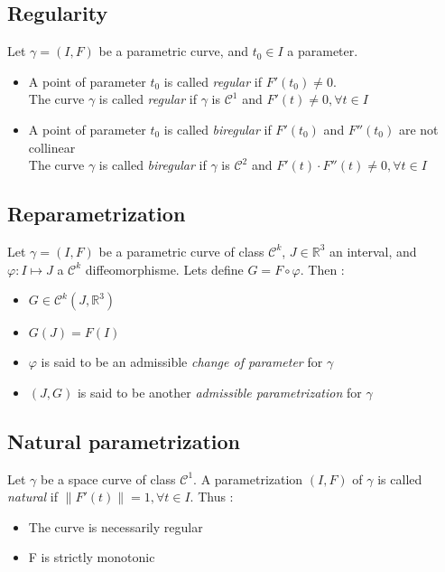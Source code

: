 \subsection{Regularity}
Let $\gamma=(I,F)$ be a parametric curve, and $t_0 \in I$ a parameter.
\begin{itemize}
\item A point of parameter $t_0$ is called \emph{regular} if $F'(t_0) \neq 0$.
\\The curve $\gamma$ is called \emph{regular} if $\gamma$ is $\mathcal{C}^{1}$ and $F'(t) \neq 0, \forall t \in I$
\item A point of parameter $t_0$ is called \emph{biregular} if $F'(t_0)$ and $F''(t_0)$ are not collinear
\\The curve $\gamma$ is called \emph{biregular} if $\gamma$ is $\mathcal{C}^{2}$ and  $F'(t)\cdot    F''(t) \neq 0, \forall t \in I$
\end{itemize}

\subsection{Reparametrization}
Let $\gamma=(I,F)$ be a parametric curve of class ${\mathcal{C}}^{k}$, $J \in {\mathbb{R}}^{3}$ an interval, and $\varphi\colon I\mapsto J$ a ${\mathcal{C}}^{k}$ diffeomorphisme. Lets define $G=F\circ\varphi$. Then :
\begin{itemize}
\item $G\in{\mathcal{C}}^{k}(J,{\mathbb{R}}^3)$
\item $G(J)=F(I)$
\item $\varphi$ is said to be an admissible \emph{change of parameter} for $\gamma$
\item  $(J,G)$ is said to be another \emph{admissible parametrization} for $\gamma$
\end{itemize}

\subsection{Natural parametrization}
Let $\gamma$ be a space curve of class ${\mathcal{C}}^{1}$. A parametrization $(I,F)$ of $\gamma$ is called \emph{natural} if $\|F'(t)\| = 1, \forall t \in I$. Thus : 
\begin{itemize}
\item The curve is necessarily regular
\item F is strictly monotonic
\end{itemize}

